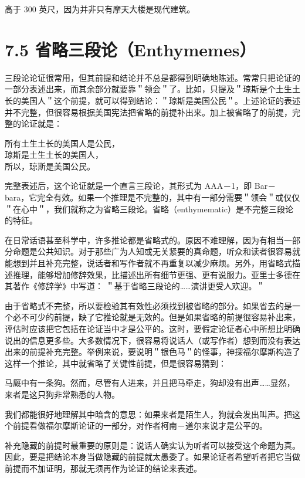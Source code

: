 高于 300 英尺，因为并非只有摩天大楼是现代建筑。

\section*{7.5 省略三段论（Enthymemes）}
三段论论证很常用，但其前提和结论并不总是都得到明确地陈述。常常只把论证的一部分表述出来，而其余部分就要靠＂领会＂了。比如，只提及＂琼斯是个土生土长的美国人＂这个前提，就可以得到结论：＂琼斯是美国公民＂。上述论证的表述并不完整，但很容易根据美国宪法把省略的前提补出来。加上被省略了的前提，完整的论证就是：

\begin{displayquote}
所有土生土长的美国人是公民，\\
琼斯是土生土长的美国人，\\
所以，琼斯是美国公民。
\end{displayquote}

完整表述后，这个论证就是一个直言三段论，其形式为 AAA－1，即 Bar－ bara，它完全有效。如果一个推理是不完整的，其中有一部分需要＂领会＂或仅仅＂在心中＂，我们就称之为省略三段论。省略（enthymematic）是不完整三段论的特征。

在日常话语甚至科学中，许多推论都是省略式的。原因不难理解，因为有相当一部分命题是公共知识。对于那些广为人知或无关紧要的真命题，听众和读者很容易就能想到并且补充完整，说话者和写作者就不再重复以减少麻烦。另外，用省略式描述推理，能够增加修辞效果，比描述出所有细节更强、更有说服力。亚里士多德在其著作《修辞学》中写道： ＂基于省略三段论的……演讲更受人欢迎。＂

由于省略式不完整，所以要检验其有效性必须找到被省略的部分。如果省去的是一个必不可少的前提，缺了它推论就是无效的。但是如果省略的前提很容易补出来，评估时应该把它包括在论证当中才是公平的。这时，要假定论证者心中所想比明确说出的信息更多些。大多数情况下，很容易将说话人（或写作者）想到而没有表达出来的前提补充完整。举例来说，要说明＂银色马＂的怪事，神探福尔摩斯构造了这样一个推论，其中就省略了关键性前提，但是很容易猜到：

马厩中有一条狗。然而，尽管有人进来，并且把马牵走，狗却没有出声……显然，来者是这只狗非常熟悉的人物。

我们都能很好地理解其中暗含的意思：如果来者是陌生人，狗就会发出叫声。把这个前提看做福尔摩斯论证的一部分，对作者柯南－道尔来说才是公平的。

补充隐藏的前提时最重要的原则是：说话人确实认为听者可以接受这个命题为真。因此，要是把结论本身当做隐藏的前提就太愚委了。如果论证者希望听者把它当做前提而不加证明，那就无须再作为论证的结论来表述。

